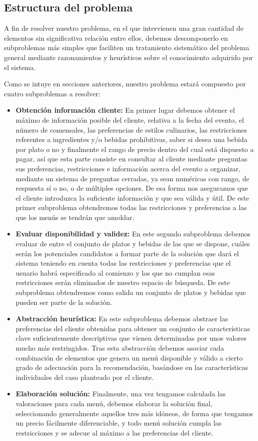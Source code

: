 \documentclass{article}
\begin{document}
\subsection{Estructura del problema}
A fin de resolver nuestro problema, en el que intervienen una gran cantidad de elementos sin significativa relación entre ellos, debemos descomponerlo en subproblemas más simples que faciliten un tratamiento sistemático del problema general mediante razonamientos y heurísticos sobre el conocimiento adquirido por el sistema.
\par
Como se intuye en secciones anteriores, nuestro problema estará compuesto por cuatro subproblemas a resolver:
\begin{itemize}
    \item \textbf{Obtención información cliente:} En primer lugar debemos obtener el máximo de información posible del cliente, relativa a la fecha del evento, el número de comensales, las preferencias de estilos culinarios, las restricciones referentes a ingredientes y/o bebidas prohibitivas, saber si desea una bebida por plato o no y finalmente el rango de precio dentro del cual está dispuesto a pagar, así que esta parte consiste en consultar al cliente mediante preguntas sus preferencias, restricciones e información acerca del evento a organizar, mediante un sistema de preguntas cerradas, ya sean numéricas con rango, de respuesta sí o no, o de múltiples opciones. De esa forma nos aseguramos que el cliente introduzca la suficiente información y que sea válida y útil. De este primer subproblema obtendremos todas las restricciones y preferencias a las que los menús se tendrán que amoldar.
    \item \textbf{Evaluar disponibilidad y validez:} En este segundo subproblema debemos evaluar de entre el conjunto de platos y bebidas de las que se dispone, cuáles serán los potenciales candidatos a formar parte de la solución que dará el sistema teniendo en cuenta todas las restricciones y preferencias que el usuario habrá especificado al comienzo y los que no cumplan esas restricciones serán eliminados de nuestro espacio de búsqueda. De este subproblema obtendremos como salida un conjunto de platos y bebidas que pueden ser parte de la solución.
    \item \textbf{Abstracción heurística:} En este subproblema debemos abstraer las preferencias del cliente obtenidas para obtener un conjunto de características clave suficientemente descriptivas que vienen determinadas por unos valores mucho más restringidos. Tras esta abstracción debemos asociar cada combinación de elementos que genera un menú disponible y válido a cierto grado de adecuación para la recomendación, basándose en las características individuales del caso planteado por el cliente.
    \item \textbf{Elaboración solución:} Finalmente, una vez tengamos calculada las valoraciones para cada menú, debemos elaborar la solución final, seleccionando generalmente aquellos tres más idóneos, de forma que tengamos un precio fácilmente diferenciable, y todo menú solución cumpla las restricciones y se adecue al máximo a las preferencias del cliente.
\end{itemize}
\end{document}
